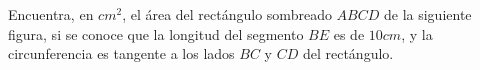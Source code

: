 Encuentra, en $cm^2$, el área del rectángulo sombreado $ABCD$ de la siguiente figura, si se conoce que la longitud del segmento $BE$ es de $10 cm$, y la circunferencia es tangente a los lados $BC$ y $CD$ del rectángulo.